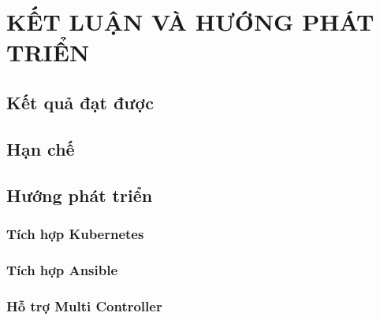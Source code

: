 \section{KẾT LUẬN VÀ HƯỚNG PHÁT TRIỂN}\label{sec:ket_luan}

\subsection{Kết quả đạt được}

\subsection{Hạn chế}

\subsection{Hướng phát triển}

\subsubsection{Tích hợp Kubernetes}

\subsubsection{Tích hợp Ansible}

\subsubsection{Hỗ trợ Multi Controller}

